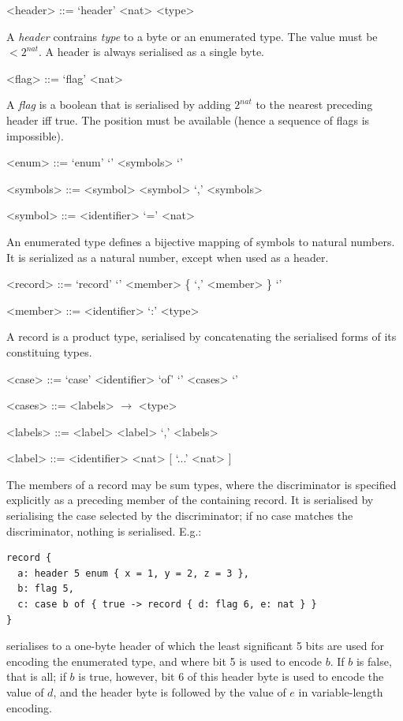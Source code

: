 \documentclass[a4paper,oneside,article]{memoir}
\begin{document}
\begin{grammar}
  <header> ::= `header' <nat> <type>
\end{grammar}

A \emph{header} contrains \emph{type} to a byte or an enumerated type.  The value must be
$< 2^{nat}$.  A header is always serialised as a single byte.

\begin{grammar}
  <flag> ::= `flag' <nat>
\end{grammar}

A \emph{flag} is a boolean that is serialised by adding $2^{nat}$ to the nearest preceding header
iff true.  The position must be available (hence a sequence of flags is impossible).

\begin{grammar}
  <enum> ::= `enum' `{' <symbols> `}'

  <symbols> ::= <symbol> \alt <symbol> `,' <symbols>
  
  <symbol> ::= <identifier> `=' <nat>
\end{grammar}

An enumerated type defines a bijective mapping of symbols to natural numbers.  It is serialized as a
natural number, except when used as a header.
  
\begin{grammar}
  <record> ::= `record' `{' <member> \{ `,' <member> \} `}'

  <member> ::= <identifier> `:' <type>
\end{grammar}

A record is a product type, serialised by concatenating the serialised forms of its constituing
types.
  
\begin{grammar}
  <case> ::= `case' <identifier> `of' `{' <cases> `}'
  
  <cases> ::= <labels> $\rightarrow$ <type>
  
  <labels> ::= <label> \alt <label> `,' <labels>
  
  <label> ::= <identifier> \alt <nat> [ `...' <nat> ]
\end{grammar}

The members of a record may be sum types, where the discriminator is specified explicitly as a
preceding member of the containing record.  It is serialised by serialising the case selected by the
discriminator; if no case matches the discriminator, nothing is serialised.  E.g.:
\begin{verbatim}
record {
  a: header 5 enum { x = 1, y = 2, z = 3 },
  b: flag 5,
  c: case b of { true -> record { d: flag 6, e: nat } }
}
\end{verbatim}
serialises to a one-byte header of which the least significant 5 bits are used for encoding the
enumerated type, and where bit 5 is used to encode $b$.  If $b$ is false, that is all; if $b$ is
true, however, bit 6 of this header byte is used to encode the value of $d$, and the header byte is
followed by the value of $e$ in variable-length encoding.
\end{document}
